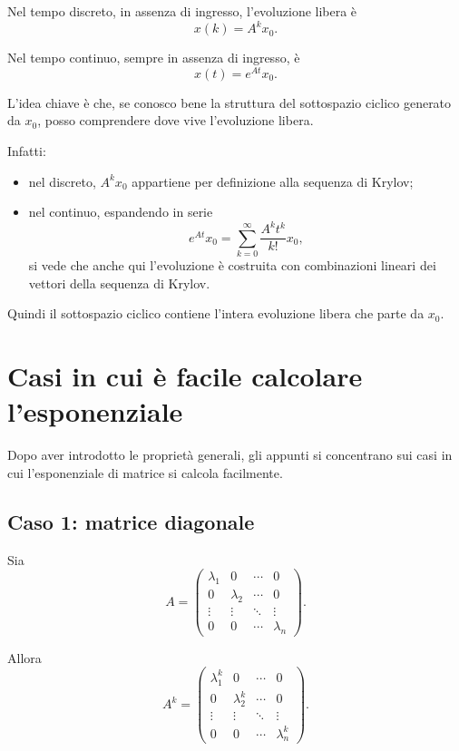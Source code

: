 Nel tempo discreto, in assenza di ingresso, l'evoluzione libera è
\[
x(k)=A^k x_0.
\]

Nel tempo continuo, sempre in assenza di ingresso, è
\[
x(t)=e^{At}x_0.
\]

L'idea chiave è che, se conosco bene la struttura del sottospazio ciclico generato da $x_0$, posso comprendere dove vive l'evoluzione libera.

Infatti:
\begin{itemize}
    \item nel discreto, $A^k x_0$ appartiene per definizione alla sequenza di Krylov;
    \item nel continuo, espandendo in serie
    \[
    e^{At}x_0=\sum_{k=0}^{\infty}\frac{A^k t^k}{k!}x_0,
    \]
    si vede che anche qui l'evoluzione è costruita con combinazioni lineari dei vettori della sequenza di Krylov.
\end{itemize}

Quindi il sottospazio ciclico contiene l'intera evoluzione libera che parte da $x_0$.

\section{Casi in cui è facile calcolare l'esponenziale}

Dopo aver introdotto le proprietà generali, gli appunti si concentrano sui casi in cui l'esponenziale di matrice si calcola facilmente.

\subsection{Caso 1: matrice diagonale}

Sia
\[
A=
\begin{pmatrix}
\lambda_1 & 0 & \cdots & 0\\
0 & \lambda_2 & \cdots & 0\\
\vdots & \vdots & \ddots & \vdots\\
0 & 0 & \cdots & \lambda_n
\end{pmatrix}.
\]

Allora
\[
A^k=
\begin{pmatrix}
\lambda_1^k & 0 & \cdots & 0\\
0 & \lambda_2^k & \cdots & 0\\
\vdots & \vdots & \ddots & \vdots\\
0 & 0 & \cdots & \lambda_n^k
\end{pmatrix}.
\]

